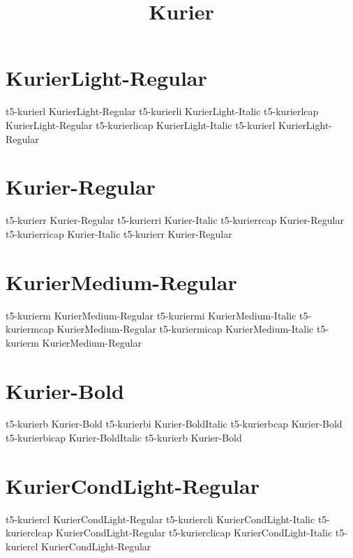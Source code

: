 \documentclass[sample]{vnsample}
\title{Kurier}
\begin{document}
\section{KurierLight-Regular}
      {t5-kurierl}      {KurierLight-Regular}
     {t5-kurierli}     {KurierLight-Italic}
     {t5-kurierlcap}   {KurierLight-Regular}
   {t5-kurierlicap}  {KurierLight-Italic}
      {t5-kurierl}      {KurierLight-Regular}

\section{Kurier-Regular}
      {t5-kurierr}      {Kurier-Regular}
     {t5-kurierri}     {Kurier-Italic}
     {t5-kurierrcap}   {Kurier-Regular}
   {t5-kurierricap}  {Kurier-Italic}
      {t5-kurierr}      {Kurier-Regular}

\section{KurierMedium-Regular}
     {t5-kurierm}      {KurierMedium-Regular}
    {t5-kuriermi}     {KurierMedium-Italic}
    {t5-kuriermcap}   {KurierMedium-Regular}
  {t5-kuriermicap}  {KurierMedium-Italic}
     {t5-kurierm}      {KurierMedium-Regular}

\section{Kurier-Bold}
      {t5-kurierb}      {Kurier-Bold}
     {t5-kurierbi}     {Kurier-BoldItalic}
     {t5-kurierbcap}   {Kurier-Bold}
   {t5-kurierbicap}  {Kurier-BoldItalic}
      {t5-kurierb}      {Kurier-Bold}

\section{KurierCondLight-Regular}
     {t5-kuriercl}     {KurierCondLight-Regular}
    {t5-kuriercli}    {KurierCondLight-Italic}
    {t5-kurierclcap}  {KurierCondLight-Regular}
  {t5-kurierclicap} {KurierCondLight-Italic}
     {t5-kuriercl}     {KurierCondLight-Regular}
\end{document}
